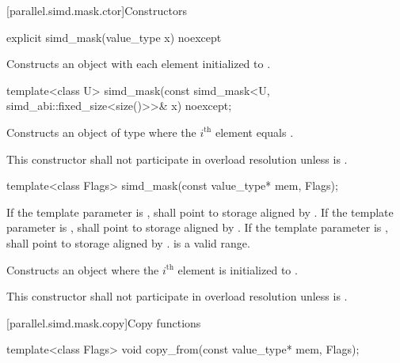 [parallel.simd.mask.ctor]{Constructors}

\begin{itemdecl}
explicit simd_mask(value_type x) noexcept
\end{itemdecl}

\begin{itemdescr}
  \pnum\effects
  Constructs an object with each element initialized to .
\end{itemdescr}

\begin{itemdecl}
template<class U> simd_mask(const simd_mask<U, simd_abi::fixed_size<size()>>& x) noexcept;
\end{itemdecl}

\begin{itemdescr}
  \pnum\effects
  Constructs an object of type  where the $i^\text{th}$ element equals  \foralli.

  \pnum\remarks
  This constructor shall not participate in overload resolution unless  is .
\end{itemdescr}

\begin{itemdecl}
template<class Flags> simd_mask(const value_type* mem, Flags);
\end{itemdecl}

\begin{itemdescr}
  \pnum\requires
  If the template parameter  is ,  shall point to storage aligned by . If the template parameter  is ,  shall point to storage aligned by . If the template parameter  is ,  shall point to storage aligned by . \tcode{[mem, mem + size())} is a valid range.

  \pnum\effects
  Constructs an object where the $i^\text{th}$ element is initialized to  \foralli.

  \pnum\remarks
  This constructor shall not participate in overload resolution unless  is .

\end{itemdescr}

[parallel.simd.mask.copy]{Copy functions}

\begin{itemdecl}
template<class Flags> void copy_from(const value_type* mem, Flags);
\end{itemdecl}

